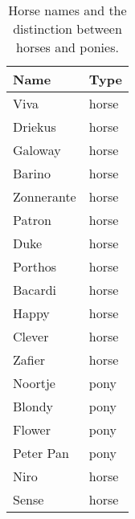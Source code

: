 \begin{table}[!htb]
	\centering
	\caption{Horse names and the distinction between horses and ponies.}
	\label{tab:horse_description}

\begin{tabular}{p{10em}p{5em}}
\toprule
\textbf{Name} & \textbf{Type} \\
\midrule
Viva  & horse \\
Driekus & horse \\
Galoway & horse \\
Barino & horse \\
Zonnerante & horse \\
Patron & horse \\
Duke  & horse \\
Porthos & horse \\
Bacardi & horse \\
Happy & horse \\
Clever & horse \\
Zafier & horse \\
Noortje & pony \\
Blondy & pony \\
Flower & pony \\
Peter Pan & pony \\
Niro  & horse \\
Sense & horse \\
\bottomrule
\end{tabular}%

\end{table}